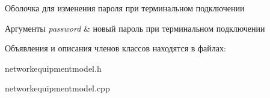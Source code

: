 Оболочка для изменения пароля при терминальном подключении 


\begin{DoxyParams}{Аргументы}
{\em password} & новый пароль при терминальном подключении \\
\hline
\end{DoxyParams}


Объявления и описания членов классов находятся в файлах\+:\begin{DoxyCompactItemize}
\item 
networkequipmentmodel.\+h\item 
networkequipmentmodel.\+cpp\end{DoxyCompactItemize}
